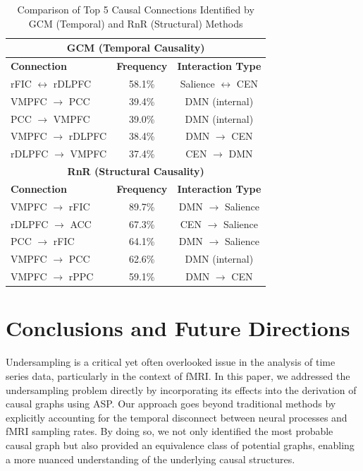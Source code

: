 \begin{table}[htbp]
\centering
\small
\caption{Comparison of Top 5 Causal Connections Identified by GCM (Temporal) and RnR (Structural) Methods}
\label{tab:top_connections_comparison}
\begin{tabular}{lcc}
\toprule
\multicolumn{3}{c}{\textbf{GCM (Temporal Causality)}} \\
\midrule
\textbf{Connection} & \textbf{Frequency} & \textbf{Interaction Type} \\
\midrule
rFIC $\leftrightarrow$ rDLPFC & 58.1\% & Salience $\leftrightarrow$ CEN \\
VMPFC $\rightarrow$ PCC & 39.4\% & DMN (internal) \\
PCC $\rightarrow$ VMPFC & 39.0\% & DMN (internal) \\
VMPFC $\rightarrow$ rDLPFC & 38.4\% & DMN $\rightarrow$ CEN \\
rDLPFC $\rightarrow$ VMPFC & 37.4\% & CEN $\rightarrow$ DMN \\
\midrule
\midrule
\multicolumn{3}{c}{\textbf{RnR (Structural Causality)}} \\
\midrule
\textbf{Connection} & \textbf{Frequency} & \textbf{Interaction Type} \\
\midrule
VMPFC $\rightarrow$ rFIC & 89.7\% & DMN $\rightarrow$ Salience \\
rDLPFC $\rightarrow$ ACC & 67.3\% & CEN $\rightarrow$ Salience \\
PCC $\rightarrow$ rFIC & 64.1\% & DMN $\rightarrow$ Salience \\
VMPFC $\rightarrow$ PCC & 62.6\% & DMN (internal) \\
VMPFC $\rightarrow$ rPPC & 59.1\% & DMN $\rightarrow$ CEN \\
\bottomrule
\end{tabular}
\vspace{-0.3cm}
\end{table}
\section{Conclusions and Future Directions}

Undersampling is a critical yet often overlooked issue in the analysis of time series data, particularly in the context of fMRI.
In this paper, we addressed the undersampling problem directly by incorporating its effects into the derivation of causal graphs using ASP. Our approach goes beyond traditional methods by explicitly accounting for the temporal disconnect between neural processes and fMRI sampling rates. By doing so, we not only identified the most probable causal graph but also provided an equivalence class of potential graphs, enabling a more nuanced understanding of the underlying causal structures.


